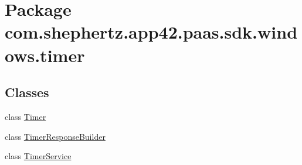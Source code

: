 \hypertarget{namespacecom_1_1shephertz_1_1app42_1_1paas_1_1sdk_1_1windows_1_1timer}{\section{Package com.\+shephertz.\+app42.\+paas.\+sdk.\+windows.\+timer}
\label{namespacecom_1_1shephertz_1_1app42_1_1paas_1_1sdk_1_1windows_1_1timer}
}
\subsection*{Classes}
\begin{DoxyCompactItemize}
\item 
class \hyperlink{classcom_1_1shephertz_1_1app42_1_1paas_1_1sdk_1_1windows_1_1timer_1_1_timer}{Timer}
\item 
class \hyperlink{classcom_1_1shephertz_1_1app42_1_1paas_1_1sdk_1_1windows_1_1timer_1_1_timer_response_builder}{Timer\+Response\+Builder}
\item 
class \hyperlink{classcom_1_1shephertz_1_1app42_1_1paas_1_1sdk_1_1windows_1_1timer_1_1_timer_service}{Timer\+Service}
\end{DoxyCompactItemize}
